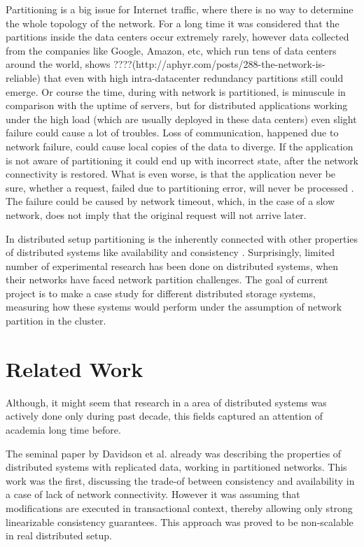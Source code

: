 \documentclass[a4paper]{article}
\begin{document}
Partitioning is a big issue for Internet traffic, where there is no way to determine the whole topology of the network.
For a long time it was considered that the partitions inside the data centers occur extremely rarely, however data collected from the companies like Google, Amazon, etc, which run tens of data centers around the world, shows ????(http://aphyr.com/posts/288-the-network-is-reliable) that even with high intra-datacenter redundancy partitions still could emerge.
Or course the time, during with network is partitioned, is minuscule in comparison with the uptime of servers, but for distributed applications working under the high load (which are usually deployed in these data centers) even slight failure could cause a lot of troubles.
Loss of communication, happened due to network failure, could cause local copies of the data to diverge.
If the application is not aware of partitioning it could end up with incorrect state, after the network connectivity is restored.
What is even worse, is that the application never be sure, whether a request, failed due to partitioning error, will never be processed . 
The failure could be caused by network timeout, which, in the case of a slow network, does not imply that the original request will not arrive later.

In distributed setup partitioning is the inherently connected with other properties of distributed systems like availability and consistency \cite{brewer2000towards}.
Surprisingly, limited number of experimental research has been done on distributed systems, when their networks have faced network partition challenges. 
The goal of current project is to make a case study for different distributed storage systems, measuring how these systems would perform under the assumption of network partition in the cluster.

\section{Related Work}

Although, it might seem that research in a area of distributed systems was actively done only during past decade, this fields captured an attention of academia long time before.

The seminal paper by Davidson et al. \cite{Davidson:1985:CPN:5505.5508} already was describing the properties of distributed systems with replicated data, working in partitioned networks.
This work was the first, discussing the trade-of between consistency and availability in a case of lack of network connectivity.
However it was assuming that modifications are executed in transactional context, thereby allowing only strong linearizable consistency guarantees.
This approach was proved to be non-scalable in real distributed setup.
\end{document}
